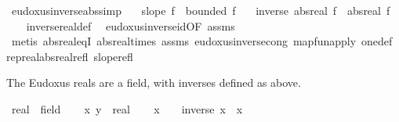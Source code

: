 \begin{isabellebody}
\isanewline
{}\isamarkupfalse%
\ eudoxus{\isacharunderscore}{\kern0pt}inverse{\isacharunderscore}{\kern0pt}abs{\isacharbrackleft}{\kern0pt}simp{\isacharbrackright}{\kern0pt}{\isacharcolon}{\kern0pt}\isanewline
\ \ \ {\isachardoublequoteopen}slope\ f{\isachardoublequoteclose}\ {\isachardoublequoteopen}{\isasymnot}\ bounded\ f{\isachardoublequoteclose}\isanewline
\ \ \ {\isachardoublequoteopen}inverse\ {\isacharparenleft}{\kern0pt}abs{\isacharunderscore}{\kern0pt}real\ f{\isacharparenright}{\kern0pt}\ {\isacharasterisk}{\kern0pt}\ abs{\isacharunderscore}{\kern0pt}real\ f\ {\isacharequal}{\kern0pt}\ {}{\isachardoublequoteclose}\isanewline
%
\isadelimproof
\ \ %
\endisadelimproof
%
\isatagproof
{}\isamarkupfalse%
\ inverse{\isacharunderscore}{\kern0pt}real{\isacharunderscore}{\kern0pt}def\ \isamarkupfalse%
\ eudoxus{\isacharunderscore}{\kern0pt}inverse{\isacharunderscore}{\kern0pt}id{\isacharbrackleft}{\kern0pt}OF\ assms{\isacharbrackright}{\kern0pt}\isanewline
\ \ \isamarkupfalse%
\ {\isacharparenleft}{\kern0pt}metis\ abs{\isacharunderscore}{\kern0pt}real{\isacharunderscore}{\kern0pt}eqI\ abs{\isacharunderscore}{\kern0pt}real{\isacharunderscore}{\kern0pt}times\ assms{\isacharparenleft}{\kern0pt}{}{\isacharparenright}{\kern0pt}\ eudoxus{\isacharunderscore}{\kern0pt}inverse{\isacharunderscore}{\kern0pt}cong\ map{\isacharunderscore}{\kern0pt}fun{\isacharunderscore}{\kern0pt}apply\ one{\isacharunderscore}{\kern0pt}def\ rep{\isacharunderscore}{\kern0pt}real{\isacharunderscore}{\kern0pt}abs{\isacharunderscore}{\kern0pt}real{\isacharunderscore}{\kern0pt}refl\ slope{\isacharunderscore}{\kern0pt}refl{\isacharparenright}{\kern0pt}%
\endisatagproof
{\isafoldproof}%
%
\isadelimproof
%
\endisadelimproof
%
\begin{isamarkuptext}%
The Eudoxus reals are a field, with inverses defined as above.%
\end{isamarkuptext}\isamarkuptrue%
\isamarkupfalse%
\ real\ {\isacharcolon}{\kern0pt}{\isacharcolon}{\kern0pt}\ field\isanewline
%
\isadelimproof
%
\endisadelimproof
%
\isatagproof
{}\isamarkupfalse%
\isanewline
\ \ \isamarkupfalse%
\ x\ y\ {\isacharcolon}{\kern0pt}{\isacharcolon}{\kern0pt}\ real\isanewline
\ \ \isamarkupfalse%
\ {\isachardoublequoteopen}x\ {\isasymnoteq}\ {}\ {\isasymLongrightarrow}\ inverse\ x\ {\isacharasterisk}{\kern0pt}\ x\ {\isacharequal}{\kern0pt}\ {}{\isachardoublequoteclose}\ \isamarkupfalse%

\end{isabellebody}
